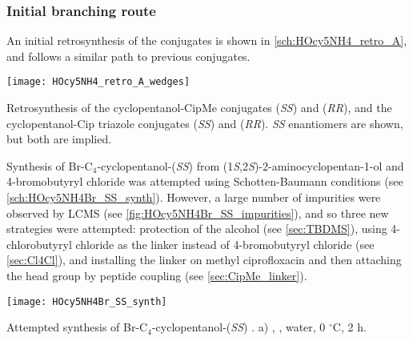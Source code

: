 \subsubsection{Initial branching route\label{sec:init_branch}}

An initial retrosynthesis of the conjugates is shown in \ref{sch:HOcy5NH4_retro_A}, and follows a similar path to previous conjugates.

\begin{scheme}[H]
	\begin{center}
		\texttt{[image: HOcy5NH4\_retro\_A\_wedges]}
		\caption{Retrosynthesis of the cyclopentanol-CipMe conjugates 
		 (\textit{SS}) and 
		 (\textit{RR}),
		and the cyclopentanol-Cip triazole conjugates 
		 (\textit{SS}) and   (\textit{RR}). 
		\textit{SS} enantiomers are shown, but both are implied. \label{sch:HOcy5NH4_retro_A}}
	\end{center}
\end{scheme}

Synthesis of Br-C$_4$-cyclopentanol-(\textit{SS})  from (1\textit{S},2\textit{S})-2-aminocyclopentan-1-ol  and 4-bromobutyryl chloride  was attempted using Schotten-Baumann conditions (see \ref{sch:HOcy5NH4Br_SS_synth}). However, a large number of impurities were observed by LCMS (see \ref{fig:HOcy5NH4Br_SS_impurities}), and so three new strategies were attempted: protection of the alcohol (see \ref{sec:TBDMS}), using 4-chlorobutyryl chloride  as the linker instead of 4-bromobutyryl chloride  (see \ref{sec:Cl4Cl}), and  installing the linker on methyl ciprofloxacin  and then attaching the head group by peptide coupling (see \ref{sec:CipMe_linker}).


\begin{scheme}[H]
	\begin{center}
		\texttt{[image: HOcy5NH4Br\_SS\_synth]}
		\caption{Attempted synthesis of Br-C$_4$-cyclopentanol-(\textit{SS}) .
		a) , , water, 0 $^{\circ}$C, 2 h. \label{sch:HOcy5NH4Br_SS_synth}}
	\end{center}
\end{scheme}

